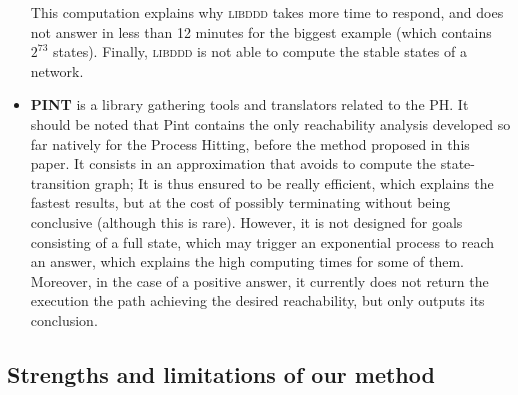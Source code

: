 \begin{itemize}
This computation explains why \textsc{libddd} takes more time to respond,
and does not answer in less than 12 minutes for the biggest example
(which contains $2^{73}$ states).
Finally, \textsc{libddd} is not able to compute the stable states of a network.

\item \textbf{PINT}
is a library gathering tools and translators related to the PH.
It should be noted that Pint contains the only reachability analysis
developed so far natively for the Process Hitting,
before the method proposed in this paper.
It consists in an approximation that avoids to compute the state-transition graph;
It is thus ensured to be really efficient, which explains the fastest results,
but at the cost of possibly terminating without being conclusive (although this is rare).
However, it is not designed for goals consisting of a full state, which
may trigger an exponential process to reach an answer,
which explains the high computing times for some of them.
Moreover, in the case of a positive answer,
it currently does not return the execution the path achieving the desired reachability,
but only outputs its conclusion.
\end{itemize}

\subsection{Strengths and limitations of our method}

